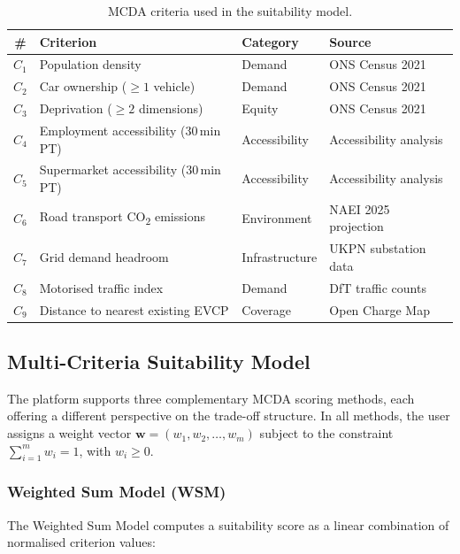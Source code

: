 \begin{table}[htbp]
\centering
\caption{MCDA criteria used in the suitability model.}
\label{tab:criteria}
\small
\begin{tabular}{clll}
\toprule
\textbf{\#} & \textbf{Criterion} & \textbf{Category} & \textbf{Source} \\
\midrule
$C_1$ & Population density & Demand & ONS Census 2021 \\
$C_2$ & Car ownership ($\geq 1$ vehicle) & Demand & ONS Census 2021 \\
$C_3$ & Deprivation ($\geq 2$ dimensions) & Equity & ONS Census 2021 \\
$C_4$ & Employment accessibility (30\,min PT) & Accessibility & Accessibility analysis \\
$C_5$ & Supermarket accessibility (30\,min PT) & Accessibility & Accessibility analysis \\
$C_6$ & Road transport CO\textsubscript{2} emissions & Environment & NAEI 2025 projection \\
$C_7$ & Grid demand headroom & Infrastructure & UKPN substation data \\
$C_8$ & Motorised traffic index & Demand & DfT traffic counts \\
$C_9$ & Distance to nearest existing EVCP & Coverage & Open Charge Map \\
\bottomrule
\end{tabular}
\end{table}

\subsection{Multi-Criteria Suitability Model}
\label{sec:mcda-model}

The platform supports three complementary MCDA scoring methods, each offering a different perspective on the trade-off structure. In all methods, the user assigns a weight vector $\mathbf{w} = (w_1, w_2, \ldots, w_m)$ subject to the constraint $\sum_{i=1}^{m} w_i = 1$, with $w_i \geq 0$.

\subsubsection{Weighted Sum Model (WSM)}

The Weighted Sum Model computes a suitability score as a linear combination of normalised criterion values:

